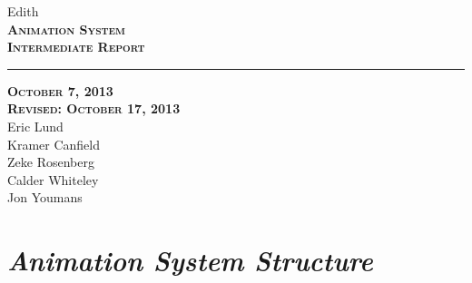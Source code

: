 \documentclass[12pt]{article}
\begin{document}
\begin{titlepage}
	\begin{center}
	\huge  Edith \\
	\vspace*{\fill}%
 	\huge \textsc{\textbf{Animation System \\Intermediate Report} }	
	\bigskip 
	\rule{130mm}{.1pt}
	\textsc{\textbf{October 7, 2013 \\ Revised: October 17, 2013} \\ }	
	\vspace*{\fill}%
	Eric Lund \\
	Kramer Canfield \\ 
	Zeke Rosenberg \\
	Calder Whiteley \\
	Jon Youmans
	\end{center}
\end{titlepage}

\section{\emph{Animation System Structure}}%
\end{document}
